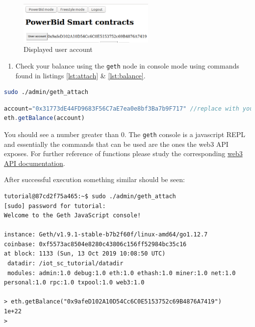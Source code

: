 \documentclass[a4paper]{article}
\begin{document}
\begin{figure}[H]
    \centering
    \includegraphics[width=0.6\textwidth]{figures/login-useracc.png}
    \caption{Displayed user account}
    \label{fig:login-user-acc}
\end{figure}

\begin{enumerate}[label=\textbf{Task \arabic*}:,l_tasks]
\item Check your balance using the \texttt{geth} node in console mode using commands found in listings \ref{lst:attach} \& \ref{lst:balance}.
\end{enumerate}

\begin{lstlisting}[language=bash,caption={attach to geth node},label={lst:attach}]
sudo ./admin/geth_attach 
\end{lstlisting}

\begin{lstlisting}[language=javascript,caption={Function for checking balance},label={lst:balance}]
account="0x31773dE44FD9683F56C7aE7ea0e8bf3Ba7b9F717" //replace with your account
eth.getBalance(account)
\end{lstlisting}

You should see a number greater than 0. The \verb!geth! console is a javascript REPL and essentially the commands that can be used are the ones the web3 API exposes. For further reference of functions please study the corresponding \href{https://web3js.readthedocs.io/en/v1.2.1/web3.html}{web3 API documentation}.


After successful execution something similar should be seen:
\begin{verbatim}
tutorial@87cd2f75a465:~$ sudo ./admin/geth_attach 
[sudo] password for tutorial: 
Welcome to the Geth JavaScript console!

instance: Geth/v1.9.1-stable-b7b2f60f/linux-amd64/go1.12.7
coinbase: 0xf5573ac8504e8280c43806c156ff52984bc35c16
at block: 1133 (Sun, 13 Oct 2019 10:08:50 UTC)
 datadir: /iot_sc_tutorial/datadir
 modules: admin:1.0 debug:1.0 eth:1.0 ethash:1.0 miner:1.0 net:1.0 personal:1.0 rpc:1.0 txpool:1.0 web3:1.0

> eth.getBalance("0x9afeD102A10D54Cc6C0E5153752c69B4876A7419")
1e+22
> 
\end{verbatim}
\end{document}
